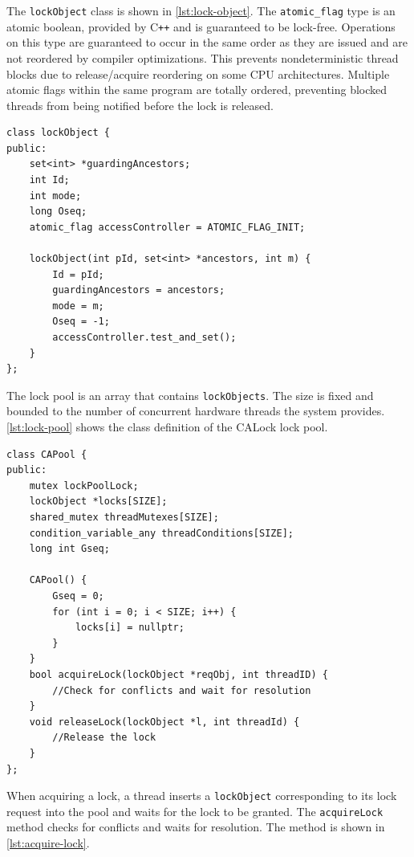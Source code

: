 The \texttt{lockObject} class is shown in \cref{lst:lock-object}. The \texttt{atomic\_flag} type is an atomic boolean, provided by C\texttt{++} and is guaranteed to be lock-free. Operations on this type are guaranteed to occur in the same order as they are issued and are not reordered by compiler optimizations. This prevents nondeterministic thread blocks due to release/acquire reordering on some CPU architectures. Multiple atomic flags within the same program are totally ordered, preventing blocked threads from being notified before the lock is released.

\begin{lstlisting}[caption={\texttt{lockObject} class.}, label={lst:lock-object}]
class lockObject {
public:
    set<int> *guardingAncestors;
    int Id;
    int mode;
    long Oseq;
    atomic_flag accessController = ATOMIC_FLAG_INIT;

    lockObject(int pId, set<int> *ancestors, int m) {
        Id = pId;
        guardingAncestors = ancestors;
        mode = m;
        Oseq = -1;
        accessController.test_and_set();
    }
};
\end{lstlisting}

The lock pool is an array that contains \texttt{lockObjects}. The size is fixed and bounded to the number of concurrent hardware threads the system provides. \cref{lst:lock-pool} shows the class definition of the CALock lock pool.

\begin{lstlisting}[caption={\texttt{lockPool} class.}, label={lst:lock-pool}]
class CAPool {
public:
    mutex lockPoolLock;
    lockObject *locks[SIZE];
    shared_mutex threadMutexes[SIZE];
    condition_variable_any threadConditions[SIZE];
    long int Gseq;

    CAPool() {
        Gseq = 0;
        for (int i = 0; i < SIZE; i++) {
            locks[i] = nullptr;
        }
    }
    bool acquireLock(lockObject *reqObj, int threadID) {
        //Check for conflicts and wait for resolution
    }
    void releaseLock(lockObject *l, int threadId) {
        //Release the lock
    }
};
\end{lstlisting}


When acquiring a lock, a thread inserts a \texttt{lockObject} corresponding to its lock request into the pool and waits for the lock to be granted. The \texttt{acquireLock} method checks for conflicts and waits for resolution. The method is shown in  \cref{lst:acquire-lock}.

